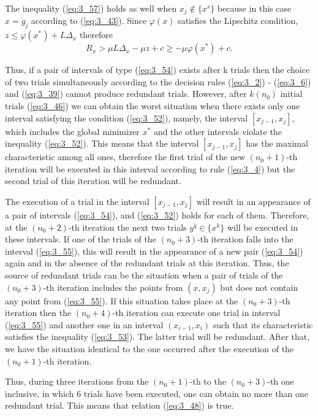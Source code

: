 	The inequality  (\ref{eq:3_57}) holds as well when $x_{j} \notin \{ x^{s} \} $ because in this case $x=g_j $ according to  (\ref{eq:3_43}). Since $\varphi (x)$ satisfies the Lipschitz condition, $z\le \varphi (x^{*} )+L\Delta _x $ therefore
	\begin{equation*}
	R_{x} >\mu L\Delta _{x} -\mu z+c\ge -\mu \varphi (x^{*} )+c.
	\end{equation*}
	
	Thus, if a pair of intervals of type  (\ref{eq:3_54}) exists after k trials then the choice of two trials simultaneously according to the decision rules  (\ref{eq:3_2}) -  (\ref{eq:3_6}) and  (\ref{eq:3_39}) cannot produce redundant trials. However, after $k(n_0)$ initial trials  (\ref{eq:3_46}) we can obtain the worst situation when there exists only one interval satisfying the condition  (\ref{eq:3_52}), namely, the interval $[x_{j-1} ,x_j ]$, which includes the global minimizer $x^{*} $ and the other intervals  violate the inequality  (\ref{eq:3_52}). This means that the interval \textit{$[x_{j-1} ,x_{j} ]$} has the maximal characteristic among all ones, therefore the first trial of the new $(n_{0} +1)$-th iteration will be executed in this interval according to rule  (\ref{eq:3_4}) but the second trial of this iteration will be  redundant. 
	
	The execution of a trial in the interval $[x_{j-1} ,x_j ]$ will result in an appearance of a pair of intervals  (\ref{eq:3_54}), and  (\ref{eq:3_52}) holds for each of them. Therefore, at the $(n_0 +2)$-th iteration the next two trials $y^q \in \{ x^k \} $ will be executed in these intervals. If one of the trials of the $(n_0 +3)$-th iteration falls into the interval  (\ref{eq:3_55}), this will result in the appearance of a new pair  (\ref{eq:3_54}) again and in the absence of the redundant trials at this iteration. Thus, the source of redundant trials can be  the situation when a pair of trials of the $(n_0 +3)$-th iteration includes the points from \textit{$(x,x_j )$} but does not contain any point from  (\ref{eq:3_55}). If this situation takes place at the $(n_0 +3)$-th iteration then the $(n_0 +4)$-th iteration can execute one trial in interval  (\ref{eq:3_55}) and another one in an interval $(x_{i-1} ,x_i )$ such that its characteristic satisfies the inequality  (\ref{eq:3_53}). The latter trial will be  redundant. After that, we have the situation identical to the one occurred after the execution of the $(n_0 +1)$-th iteration.
	
	Thus, during three iterations from the $(n_0 +1)$-th to the $(n_0 +3)$-th one inclusive, in which 6 trials have been executed, one can obtain  no more than one redundant trial. This means that relation  (\ref{eq:3_48}) is true.
	
